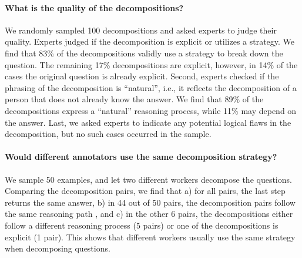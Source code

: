 {\paragraph{What is the quality of the decompositions?}
We randomly sampled 100 decompositions and asked experts to judge their quality.
Experts judged if the decomposition is explicit or utilizes a strategy. We find that 83\% of the decompositions validly use a strategy to break down the question. The remaining 17\% decompositions are explicit, however, in 14\% of the cases the original question is already explicit. Second, experts checked if the phrasing of the decomposition is ``natural'', i.e., it reflects the decomposition of a person that does not already know the answer. We find that 89\% of the decompositions express a ``natural'' reasoning process, while 11\% may depend on the answer. Last, we asked experts to indicate any potential logical flaws in the decomposition, but no such cases occurred in the sample.


\paragraph{Would different annotators use the same decomposition strategy?}
We sample 50 examples, and let two different workers decompose the questions. 
Comparing the decomposition pairs, we find that a) for all pairs, the last step returns the same answer, b) in 44 out of 50 pairs, the decomposition pairs follow the same reasoning path , and c) in the other 6 pairs, the decompositions either follow a different reasoning process (5 pairs) or one of the decompositions is explicit (1 pair). 
This shows that different workers usually use the same strategy when decomposing questions. 

}
